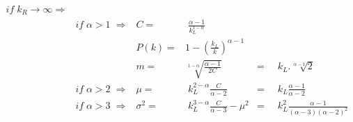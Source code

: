 \documentclass[10pt,letterpaper]{article}
\begin{document}
\begin{align}\label{eq:md}
	if \; k_R \rightarrow \infty \Rightarrow & & \nonumber\\
											      & if\; \alpha>1 \;\Rightarrow	& C = &\; \frac{\alpha-1}{k_L^{1-\alpha}}\nonumber\\
							   & & P(k) =& 1-\left(\frac{k_L}{k}\right)^{\alpha-1}\nonumber\\
										       &  & m  = & \sqrt[1-\alpha]{\frac{\alpha-1}{2C}}&=&\;\;k_L.\sqrt[\alpha-1]{2}&\\
							   & if\; \alpha>2 \;\Rightarrow	& \mu = & \;k_L^{2-\alpha}\frac{C}{\alpha-2}&= &\;\;k_L\frac{\alpha-1}{\alpha-2}& \nonumber\\
							& if\; \alpha>3 \;\Rightarrow	& \sigma^2 = & \;k_L^{3-\alpha}\frac{C}{\alpha-3}-\mu^2&= &\;\;k_L^2\frac{\alpha-1}{(\alpha-3)(\alpha-2)^2}&\nonumber
\end{align}





\nolinenumbers

%
%
% 
% 
\end{document}
